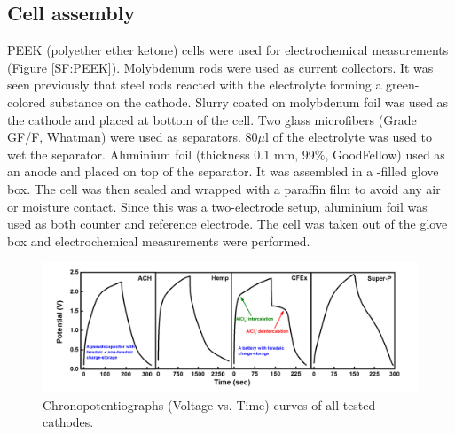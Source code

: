 \subsection{Cell assembly}
PEEK (polyether ether ketone) cells were used for electrochemical measurements (Figure \ref{SF:PEEK}). Molybdenum rods were used as current collectors. It was seen previously that steel rods reacted with the electrolyte forming a green-colored substance on the cathode. Slurry coated on molybdenum foil was used as the cathode and placed at bottom of the cell. Two glass microfibers (Grade GF/F, Whatman) were used as separators. 80$\mu$l of the electrolyte was used to wet the separator. Aluminium foil (thickness 0.1 mm, 99$\%$, GoodFellow) used as an anode and placed on top of the separator. It was assembled in a -filled glove box. The cell was then sealed and wrapped with a paraffin film to avoid any air or moisture contact. Since this was a two-electrode setup, aluminium foil was used as both counter and reference electrode. The cell was taken out of the glove box and electrochemical measurements were performed. 
\begin{figure}[tbh!]
  \centering
  \includegraphics[width=\textwidth]{Figures/chap5fig/gcdall}
    \caption{Chronopotentiographs (Voltage vs. Time) curves of all tested cathodes.}
  \label{Figures/chap5fig:gcdall}
\end{figure}

